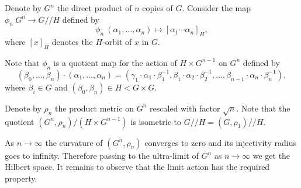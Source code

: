 Denote by $G^n$ the direct product of $n$ copies of $G$.
Consider the map $\phi_n\:G^n\to G/\!\!/H$ defined by
\[\phi_n\:(\alpha_1,\dots,\alpha_n)\mapsto [\alpha_1\cdots\alpha_n]_H,\]
where $[x]_H$ denotes the $H$-orbit of $x$ in $G$.

Note that $\phi_n$ is a quotient map for the action of $H\times G^{n-1}$ on $G^n$ defined by
\[(\beta_0,\dots,\beta_n)\cdot(\alpha_1,\dots,\alpha_n)=(\gamma_1\cdot \alpha_1\cdot\beta_1^{-1},\beta_1\cdot\alpha_2\cdot\beta_2^{-1},\dots,\beta_{n-1}\cdot\alpha_n\cdot\beta_n^{-1}),\]
where $\beta_i\in G$ and $(\beta_0,\beta_n)\in H<G\times G$. 

Denote by $\rho_n$ the product metric on $G^n$ rescaled with factor $\sqrt{n}$.
Note that the quotient $(G^n,\rho_n)/(H\times G^{n-1})$ is isometric to $G/\!\!/H=(G,\rho_1)/\!\!/H$.

As $n\to\infty$ the curvature of $(G^n,\rho_n)$ converges to zero and its injectivity radius goes to infinity.
Therefore passing to the ultra-limit of $G^n$ as $n\to\infty$ we get the Hilbert space.
It remains to observe that the limit action has the required property.
\qeds